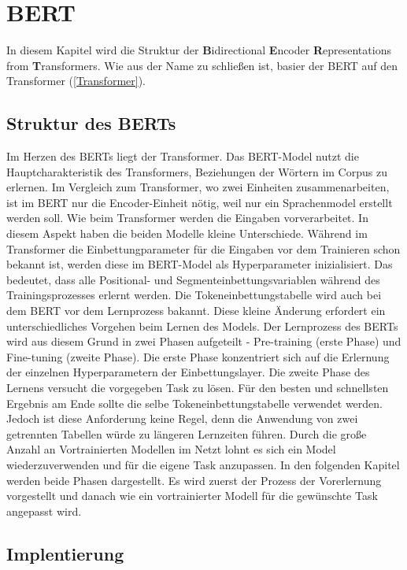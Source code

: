 \chapter{BERT}

In diesem Kapitel wird die Struktur der \textbf{B}idirectional \textbf{E}ncoder \textbf{R}epresentations from \textbf{T}ransformers. Wie aus der Name zu schließen ist, basier der BERT auf den Transformer (\ref{Transformer}).

\section{Struktur des BERTs}

Im Herzen des BERTs liegt der Transformer. Das BERT-Model nutzt die Hauptcharakteristik des Transformers, Beziehungen der Wörtern im Corpus zu erlernen. Im Vergleich zum Transformer, wo zwei Einheiten zusammenarbeiten, ist im BERT nur die Encoder-Einheit nötig, weil nur ein Sprachenmodel erstellt werden soll. Wie beim Transformer werden die Eingaben vorverarbeitet. In diesem Aspekt haben die beiden Modelle kleine Unterschiede. Während im Transformer die Einbettungparameter  für die Eingaben vor dem Trainieren schon bekannt ist, werden diese im BERT-Model als Hyperparameter inizialisiert. Das bedeutet, dass alle Positional- und Segmenteinbettungsvariablen während des Trainingsprozesses erlernt werden. Die Tokeneinbettungstabelle wird auch bei dem BERT vor dem Lernprozess bakannt. Diese kleine Änderung erfordert ein unterschiedliches Vorgehen beim Lernen des Models. Der Lernprozess des BERTs wird aus diesem Grund in zwei Phasen aufgeteilt - Pre-training (erste Phase) und Fine-tuning (zweite Phase). Die erste Phase konzentriert sich auf die Erlernung der einzelnen Hyperparametern der Einbettungslayer. Die zweite Phase des Lernens versucht die vorgegeben Task zu lösen. Für den besten und schnellsten Ergebnis am Ende sollte die selbe Tokeneinbettungstabelle verwendet werden. Jedoch ist diese Anforderung keine Regel, denn die Anwendung von zwei getrennten Tabellen würde zu längeren Lernzeiten führen. Durch die große Anzahl an Vortrainierten Modellen im Netzt lohnt es sich ein Model wiederzuverwenden und für die eigene Task anzupassen. In den folgenden Kapitel werden beide Phasen dargestellt. Es wird zuerst der Prozess der Vorerlernung vorgestellt und danach wie ein vortrainierter Modell für die gewünschte Task angepasst wird.

\section{Implentierung}

